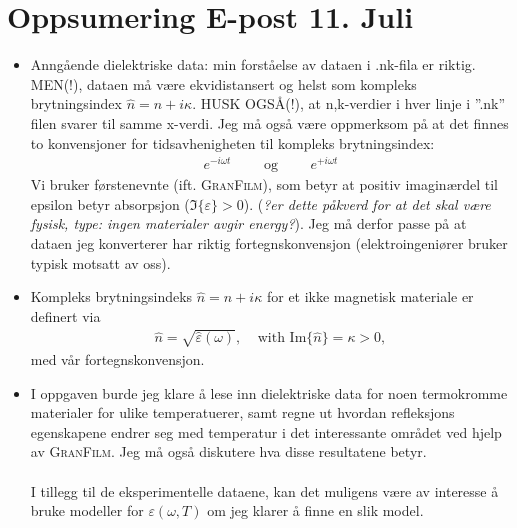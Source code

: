 \section{Oppsumering E-post 11. Juli}
\begin{itemize}
\item
Anngående dielektriske data: min forståelse av dataen i .nk-fila er riktig.
MEN(!), dataen må være ekvidistansert og helst som kompleks brytningsindex $\hat{n}=n+i\kappa$.
HUSK OGSÅ(!), at n,k-verdier i hver linje i ''.nk'' filen svarer til samme x-verdi.
Jeg må også være oppmerksom på at det finnes to konvensjoner for
tidsavhenigheten til kompleks brytningsindex:
\begin{align}
   e^{-i\omega t}  \:\:\:\:\:\:\:\:\: \text{ og }  \:\:\:\:\:\:\:\:\: e^{+i\omega t} 
\end{align}
Vi bruker førstenevnte (ift. \textsc{GranFilm}), som betyr at positiv
imaginærdel til epsilon betyr absorpsjon ($\Im\{\varepsilon\}>0$). 
(\textit{?er dette påkverd for at det skal være fysisk, type: ingen materialer avgir energy?}).
Jeg må derfor passe på at dataen jeg konverterer har riktig fortegnskonvensjon (elektroingeniører
bruker typisk motsatt av oss).

\item
Kompleks brytningsindeks $\hat{n}=n+i\kappa$ for et ikke magnetisk materiale er definert via
\begin{align}
   \hat{n} = \sqrt{\hat{\varepsilon}(\omega)}, \:\:\:\:\: \text{with Im}\{\hat{n}\} = \kappa > 0,
\end{align}
med vår fortegnskonvensjon.

\item I oppgaven burde jeg klare å lese inn dielektriske data for noen termokromme materialer
   for ulike temperatuerer, samt regne ut hvordan refleksjons egenskapene endrer seg med 
   temperatur i det interessante området ved hjelp av \textsc{GranFilm}.
   Jeg må også diskutere hva disse resultatene betyr.
   \\
   \\
   I tillegg til de eksperimentelle dataene, kan det muligens være av interesse å
   bruke modeller for $\varepsilon(\omega, T)$ om jeg klarer å finne en slik model.
\end{itemize}
